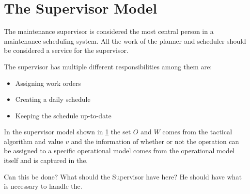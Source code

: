 \section{The Supervisor Model}
The maintenance supervisor is considered the most central person in a maintenance scheduling system. 
All the work of the planner and scheduler should be considered a service for the supervisor.

The supervisor has multiple different responsibilities among them are: 

\begin{itemize}
	\item Assigning work orders
	\item Creating a daily schedule
	\item Keeping the schedule up-to-date
\end{itemize}



In the supervisor model shown in \ref{} the set $O$ and $W$ comes from the tactical algorithm
and value $v$ and the information of whether or not the operation can be assigned to a 
specific operational model comes from the operational model itself and is captured in the.

Can this be done? What should the Supervisor have here? He should have what is necessary to
handle the. 
